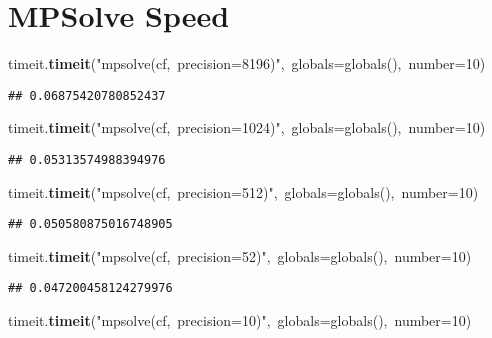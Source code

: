 \documentclass{article}\usepackage[]{graphicx}\usepackage[dvipsnames,table]{xcolor}
\makeatletter
\newcommand{\hlnum}[1]{\textcolor[rgb]{0.686,0.059,0.569}{#1}}%
\newcommand{\hlsng}[1]{\textcolor[rgb]{0.192,0.494,0.8}{#1}}%
\newcommand{\hlopt}[1]{\textcolor[rgb]{0,0,0}{#1}}%
\newcommand{\hldef}[1]{\textcolor[rgb]{0.345,0.345,0.345}{#1}}%
\newcommand{\hlkwb}[1]{\textcolor[rgb]{0.69,0.353,0.396}{#1}}%
\newcommand{\hlkwd}[1]{\textcolor[rgb]{0.737,0.353,0.396}{\textbf{#1}}}%
\newenvironment{kframe}{%
 \def\at@end@of@kframe{}%
 \ifinner\ifhmode%
  \def\at@end@of@kframe{\end{minipage}}%
  \begin{minipage}{\columnwidth}%
 \fi\fi%
 \def\FrameCommand##1{\hskip\@totalleftmargin \hskip-\fboxsep
 \colorbox{shadecolor}{##1}\hskip-\fboxsep
     \hskip-\linewidth \hskip-\@totalleftmargin \hskip\columnwidth}%
 \MakeFramed {\advance\hsize-\width
   \@totalleftmargin\z@ \linewidth\hsize
   \@setminipage}}%
 {\par\unskip\endMakeFramed%
 \at@end@of@kframe}
\newenvironment{knitrout}{}{} %
\makeatother
\begin{document}
\newpage
\section{MPSolve Speed}
\begin{center}
\begin{minipage}[m]{18cm}
\begin{knitrout}\small
{}\color{fgcolor}\begin{kframe}
\noindent
\ttfamily
\hldef{timeit}\hlopt{.}\hldef{}\hlkwd{timeit}\hldef{}\hlopt{(}\hldef{}\hlsng{"mpsolve(cf,\ precision=8196)"}\hldef{}\hlopt{,\ }\hldef{}\hlkwb{globals}\hldef{}\hlopt{=}\hldef{}\hlkwb{globals}\hldef{}\hlopt{(),\ }\hldef{number}\hlopt{=}\hldef{}\hlnum{10}\hldef{}\hlopt{)}\hldef{}\hspace*{\fill}
\mbox{}
\normalfont
\begin{verbatim}
## 0.06875420780852437
\end{verbatim}
\noindent
\ttfamily
\hldef{timeit}\hlopt{.}\hldef{}\hlkwd{timeit}\hldef{}\hlopt{(}\hldef{}\hlsng{"mpsolve(cf,\ precision=1024)"}\hldef{}\hlopt{,\ }\hldef{}\hlkwb{globals}\hldef{}\hlopt{=}\hldef{}\hlkwb{globals}\hldef{}\hlopt{(),\ }\hldef{number}\hlopt{=}\hldef{}\hlnum{10}\hldef{}\hlopt{)}\hldef{}\hspace*{\fill}
\mbox{}
\normalfont
\begin{verbatim}
## 0.05313574988394976
\end{verbatim}
\noindent
\ttfamily
\hldef{timeit}\hlopt{.}\hldef{}\hlkwd{timeit}\hldef{}\hlopt{(}\hldef{}\hlsng{"mpsolve(cf,\ precision=512)"}\hldef{}\hlopt{,\ }\hldef{}\hlkwb{globals}\hldef{}\hlopt{=}\hldef{}\hlkwb{globals}\hldef{}\hlopt{(),\ }\hldef{number}\hlopt{=}\hldef{}\hlnum{10}\hldef{}\hlopt{)}\hldef{}\hspace*{\fill}
\mbox{}
\normalfont
\begin{verbatim}
## 0.050580875016748905
\end{verbatim}
\noindent
\ttfamily
\hldef{timeit}\hlopt{.}\hldef{}\hlkwd{timeit}\hldef{}\hlopt{(}\hldef{}\hlsng{"mpsolve(cf,\ precision=52)"}\hldef{}\hlopt{,\ }\hldef{}\hlkwb{globals}\hldef{}\hlopt{=}\hldef{}\hlkwb{globals}\hldef{}\hlopt{(),\ }\hldef{number}\hlopt{=}\hldef{}\hlnum{10}\hldef{}\hlopt{)}\hldef{}\hspace*{\fill}
\mbox{}
\normalfont
\begin{verbatim}
## 0.047200458124279976
\end{verbatim}
\noindent
\ttfamily
\hldef{timeit}\hlopt{.}\hldef{}\hlkwd{timeit}\hldef{}\hlopt{(}\hldef{}\hlsng{"mpsolve(cf,\ precision=10)"}\hldef{}\hlopt{,\ }\hldef{}\hlkwb{globals}\hldef{}\hlopt{=}\hldef{}\hlkwb{globals}\hldef{}\hlopt{(),\ }\hldef{number}\hlopt{=}\hldef{}\hlnum{10}\hldef{}\hlopt{)}\hldef{}\hspace*{\fill}

\end{kframe}
\end{knitrout}
\end{minipage}
\end{center}
\end{document}
